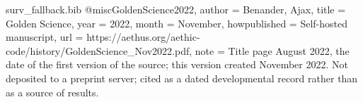 \begin{filecontents}[overwrite]{surv_fallback.bib}
@misc{GoldenScience2022,
  author       = {Benander, Ajax},
  title        = {Golden Science},
  year         = {2022},
  month        = {November},
  howpublished = {Self-hosted manuscript},
  url          = {https://aethus.org/aethic-code/history/GoldenScience_Nov2022.pdf},
  note         = {Title page August 2022, the date of the first version of the source; this version created November 2022. Not deposited to a
                  preprint server; cited as a dated developmental record rather than
                  as a source of results.}
}
\end{filecontents}
